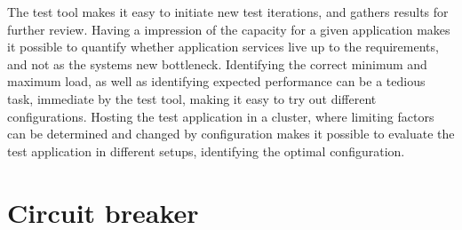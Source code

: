 The test tool makes it easy to initiate new test iterations, and gathers results for further review. Having a impression of the capacity for a given application makes it possible to quantify whether application services live up to the requirements, and not as the systems new bottleneck. Identifying the correct minimum and maximum load, as well as identifying expected performance can be a tedious task, immediate by the test tool, making it easy to try out different configurations. Hosting the test application in a cluster, where limiting factors can be determined and changed by configuration makes it possible to evaluate the test application in different setups, identifying the optimal configuration.



\section{Circuit breaker}



